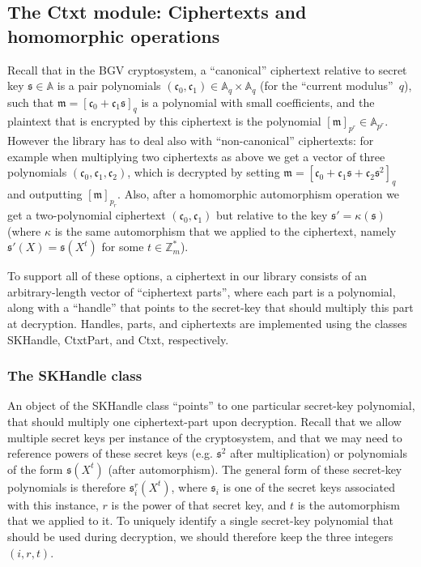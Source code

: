\documentclass[14pt]{extarticle}
\newcommand{\A}{\mathbb{A}}
\newcommand{\Z}{\mathbb{Z}}
\def\Ctxt{\textsf{Ctxt}}
\def\SKHandle{\textsf{SKHandle}}
\def\CtxtPart{\textsf{CtxtPart}}
\newcommand{\ct}{\mathfrak{c}}
\newcommand{\mm}{\mathfrak{m}}
\newcommand{\sk}{\mathfrak{s}}
\begin{document}
\subsection{The {\Ctxt} module: Ciphertexts and homomorphic operations}
\label{sec:Ctxt}
Recall that in the BGV cryptosystem, a ``canonical'' ciphertext
relative to secret key $\sk\in\A$ is a pair polynomials
$(\ct_0,\ct_1)\in \A_q \times \A_q$ (for the ``current modulus''~$q$), such
that $\mm=[\ct_0+\ct_1\sk]_q$ is a polynomial with small coefficients,
and the plaintext that is encrypted by this ciphertext is the
polynomial $[\mm]_{p^r}\in\A_{p^r}$. However the library has to deal also
with ``non-canonical'' ciphertexts: for example when multiplying two
ciphertexts as above we get a vector of three polynomials $(\ct_0,
\ct_1,\ct_2)$, which is decrypted by setting $\mm=[\ct_0+\ct_1\sk
+\ct_2\sk^2]_q$ and outputting $[\mm]_{p_r}$. Also, after a homomorphic
automorphism operation we get a two-polynomial ciphertext $(\ct_0,
\ct_1)$ but relative to the key $\sk'=\kappa(\sk)$ (where $\kappa$
is the same automorphism that we applied to the ciphertext, namely
$\sk'(X)=\sk(X^t)$ for some $t\in\Z_m^*$).

To support all of these options, a ciphertext in our library
consists of an arbitrary-length vector of ``ciphertext parts'',
where each part is a polynomial, along with a ``handle''
that points to the secret-key that should multiply this part at
decryption. Handles, parts, and ciphertexts are implemented
using the classes {\SKHandle}, {\CtxtPart}, and {\Ctxt}, respectively.

\subsubsection{The {\SKHandle} class}\label{sec:SKHandle}
An object of the {\SKHandle} class ``points'' to one particular
secret-key polynomial, that should multiply one ciphertext-part
upon decryption. Recall that we allow multiple secret
keys per instance of the cryptosystem, and that we may need to
reference powers of these secret keys (e.g. $\sk^2$ after
multiplication) or polynomials of the form $\sk(X^t)$ (after
automorphism). The general form of these secret-key polynomials is
therefore $\sk_i^r(X^t)$, where $\sk_i$ is one of the secret keys
associated with this instance, $r$ is the power of that secret key,
and $t$ is the automorphism that we applied to it. To uniquely
identify a single secret-key polynomial that should be used during
decryption, we should therefore keep the three integers $(i,r,t)$.
\end{document}

